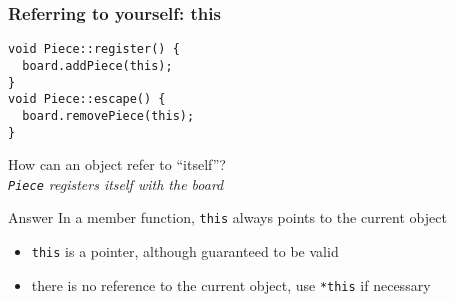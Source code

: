 \documentclass{slides}
\begin{document}
\begin{frame}[fragile]
  \frametitle{Referring to yourself: this}

\begin{lstlisting}[emph={this}]
void Piece::register() {
  board.addPiece(this);
}
void Piece::escape() {
  board.removePiece(this);
}
\end{lstlisting}

  \begin{block}{}
    How can an object refer to ``itself''?\\
    \emph{\lstinline!Piece! registers itself with the board}
  \end{block}

  \begin{block}{Answer}
    In a member function, \lstinline!this! always points to the
    current object
  \end{block}

  \begin{itemize}
  \item \lstinline!this! is a pointer, although guaranteed to be valid
  \item there is no reference to the current object, use \lstinline!*this!
    if necessary
  \end{itemize}
\end{frame}
\end{document}
